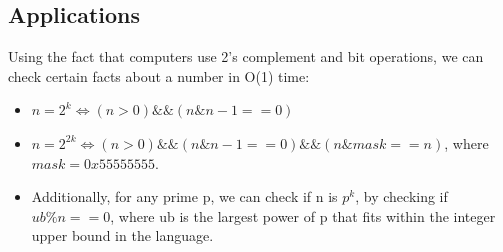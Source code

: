 \documentclass{report}
\begin{document}
\subsection{Applications}
Using the fact that computers use 2's complement and bit operations, we can check certain facts about a number in O(1) time:
\begin{itemize}
\item $n = 2^k \iff (n>0) \&\& (n \& n-1 == 0)$
\item $n = 2^{2k} \iff (n>0) \&\& (n \& n-1 ==0) \&\& (n \& mask == n)$, where $mask = 0x55555555$.
\item Additionally, for any prime p, we can check if n is $p^k$, by checking if $ub \% n==0$, where ub is the largest power of p that fits within the integer upper bound in the language.
\end{itemize}
\end{document}
